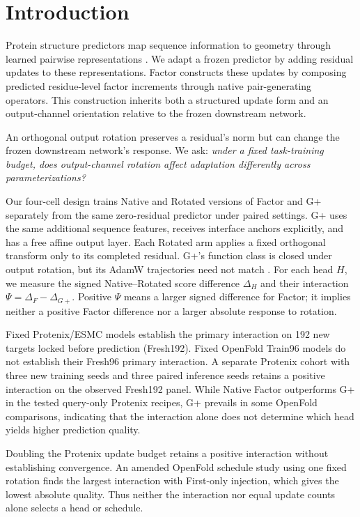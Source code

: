 \section{Introduction}
\label{sec:introduction}
Protein structure predictors map sequence information to geometry through
learned pairwise representations
\citep{jumper2021alphafold,gong2025protenix,seo2026atlasfold}.
We adapt a frozen predictor by adding residual updates to these
representations. Factor constructs these updates by composing predicted
residue-level factor increments through native pair-generating operators.
This construction inherits both a structured update form and an
output-channel orientation relative to the frozen downstream network.

An orthogonal output rotation preserves a residual's norm but can change
the frozen downstream network's response. We ask: \emph{under a fixed
task-training budget, does output-channel rotation affect adaptation
differently across parameterizations?}

Our four-cell design trains Native and Rotated versions of Factor and G+
separately from the same zero-residual predictor under paired settings.
G+ uses the same additional sequence features, receives interface anchors
explicitly, and has a free affine output layer. Each Rotated arm applies
a fixed orthogonal transform only to its completed residual. G+'s function
class is closed under output rotation, but its AdamW trajectories need not
match \citep{loshchilov2019adamw}. For each head $H$, we measure the signed
Native--Rotated score difference $\Delta_H$ and their interaction
$\Psi=\Delta_F-\Delta_{G+}$. Positive $\Psi$ means a larger signed difference
for Factor; it implies neither a positive Factor difference nor a larger
absolute response to rotation.

Fixed Protenix/ESMC models establish the primary interaction on 192 new
targets locked before prediction (Fresh192). Fixed OpenFold Train96 models
\citep{ahdritz2024openfold} do not establish their Fresh96 primary
interaction. A separate Protenix cohort with three new training seeds and
three paired inference seeds retains a positive interaction on the observed
Fresh192 panel. While Native Factor outperforms G+ in the tested query-only
Protenix recipes, G+ prevails in some OpenFold comparisons, indicating that
the interaction alone does not determine which head yields higher
prediction quality.

Doubling the Protenix update budget retains a positive interaction without
establishing convergence. An amended OpenFold schedule study using one
fixed rotation finds the largest interaction with First-only injection,
which gives the lowest absolute quality. Thus neither the interaction nor
equal update counts alone selects a head or schedule.

